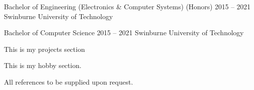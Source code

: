 \documentclass[9pt]{extarticle}
\begin{document}
\cvbreak


\begin{minipage}[t]{\textwidth}
	\vspace{-\baselineskip}

	\cveducation
		{Bachelor of Engineering (Electronics \& Computer Systems) (Honors)}
		{2015 -- 2021}
		{Swinburne University of Technology}

	\cveducation
		{Bachelor of Computer Science}
		{2015 -- 2021}
		{Swinburne University of Technology}
\end{minipage}

\cvbreak


\begin{minipage}[t]{0.3\textwidth}
	\vspace{-\baselineskip}

	This is my projects section
\end{minipage}
\hfill
\begin{minipage}[t]{0.3\textwidth}
	\vspace{-\baselineskip}

	This is my hobby section.
\end{minipage}
\hfill
\begin{minipage}[t]{0.3\textwidth}
	\vspace{-\baselineskip}

	All references to be supplied upon request.
\end{minipage}
\end{document}
